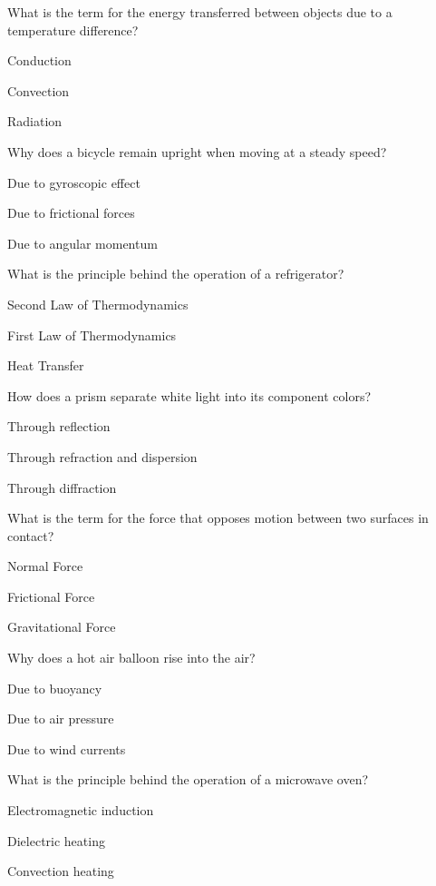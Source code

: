 \begin{enhancedmcq}{What is the term for the energy transferred between objects due to a temperature difference?}
\item Conduction
\item Convection
\item Radiation

\end{enhancedmcq}
\begin{enhancedmcq}{Why does a bicycle remain upright when moving at a steady speed?}
\item Due to gyroscopic effect
\item Due to frictional forces
\item Due to angular momentum

\end{enhancedmcq}
\begin{enhancedmcq}{What is the principle behind the operation of a refrigerator?}
\item Second Law of Thermodynamics
\item First Law of Thermodynamics
\item Heat Transfer

\end{enhancedmcq}
\begin{enhancedmcq}{How does a prism separate white light into its component colors?}
\item Through reflection
\item Through refraction and dispersion
\item Through diffraction

\end{enhancedmcq}
\begin{enhancedmcq}{What is the term for the force that opposes motion between two surfaces in contact?}
\item Normal Force
\item Frictional Force
\item Gravitational Force

\end{enhancedmcq}
\begin{enhancedmcq}{Why does a hot air balloon rise into the air?}
\item Due to buoyancy
\item Due to air pressure
\item Due to wind currents

\end{enhancedmcq}
\begin{enhancedmcq}{What is the principle behind the operation of a microwave oven?}
\item Electromagnetic induction
\item Dielectric heating
\item Convection heating

\end{enhancedmcq}
